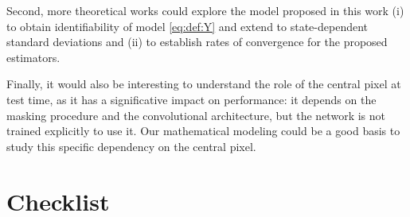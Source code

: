 \documentclass{article}
\begin{document}
Second, more theoretical works could explore the model proposed in this work  (i) to obtain identifiability of model \eqref{eq:def:Y} and extend \cite{gassiat:lecorff:lehericy:2021} to state-dependent standard deviations and (ii) to establish rates of convergence for the proposed estimators.

Finally, it would also be interesting to understand the role of the central pixel at test time, as it has a significative impact on performance: it depends on the  masking procedure and the convolutional architecture, but the network is not trained explicitly to use it. Our mathematical modeling could be a good basis to study this specific dependency on the central pixel.

\FloatBarrier
\pagebreak



%


\section*{Checklist}
\end{document}
